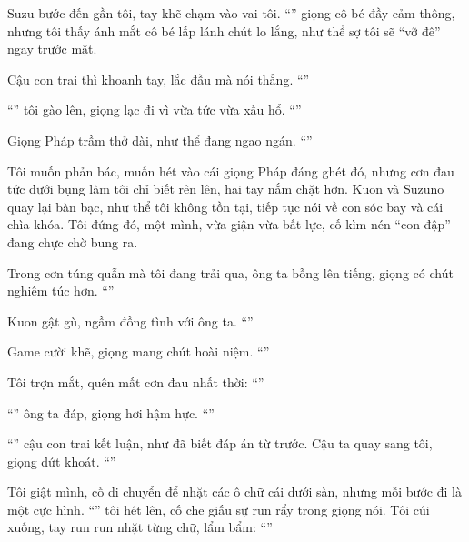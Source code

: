 \documentclass[../main.tex]{subfiles}
\begin{document}
Suzu bước đến gần tôi, tay khẽ chạm vào vai tôi. ``'' giọng cô bé đầy cảm thông, nhưng tôi thấy ánh mắt cô bé lấp lánh chút lo lắng, như thể sợ tôi sẽ ``vỡ đê'' ngay trước mặt.

Cậu con trai thì khoanh tay, lắc đầu mà nói thẳng. ``''

``'' tôi gào lên, giọng lạc đi vì vừa tức vừa xấu hổ. ``''

Giọng Pháp trầm thở dài, như thể đang ngao ngán. ``''

Tôi muốn phản bác, muốn hét vào cái giọng Pháp đáng ghét đó, nhưng cơn đau tức dưới bụng làm tôi chỉ biết rên lên, hai tay nắm chặt hơn. Kuon và Suzuno quay lại bàn bạc, như thể tôi không tồn tại, tiếp tục nói về con sóc bay và cái chìa khóa. Tôi đứng đó, một mình, vừa giận vừa bất lực, cố kìm nén ``con đập'' đang chực chờ bung ra.

Trong cơn túng quẫn mà tôi đang trải qua, ông ta bỗng lên tiếng, giọng có chút nghiêm túc hơn. ``''

Kuon gật gù, ngầm đồng tình với ông ta. ``''

Game cười khẽ, giọng mang chút hoài niệm. ``''

Tôi trợn mắt, quên mất cơn đau nhất thời: ``''

``'' ông ta đáp, giọng hơi hậm hực. ``''

``'' cậu con trai kết luận, như đã biết đáp án từ trước. Cậu ta quay sang tôi, giọng dứt khoát. ``''

Tôi giật mình, cố di chuyển để nhặt các ô chữ cái dưới sàn, nhưng mỗi bước đi là một cực hình. ``'' tôi hét lên, cố che giấu sự run rẩy trong giọng nói. Tôi cúi xuống, tay run run nhặt từng chữ, lẩm bẩm: ``''
\end{document}
